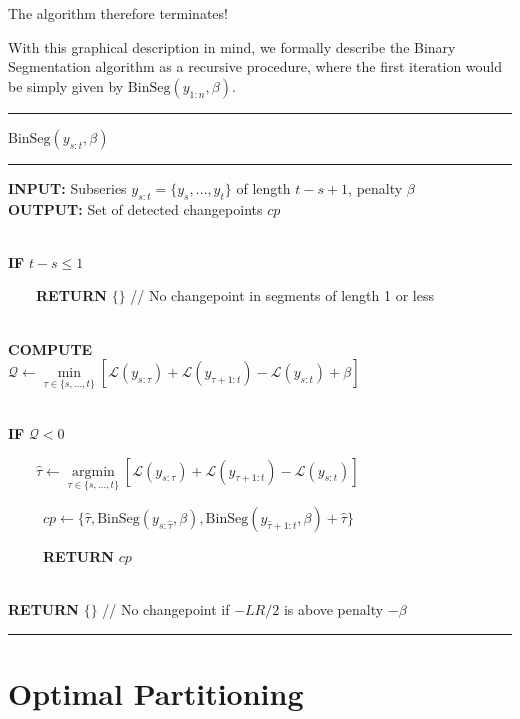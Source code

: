 \documentclass[
  letterpaper,
  DIV=11,
  numbers=noendperiod]{scrreprt}
\begin{document}
The algorithm therefore terminates!

With this graphical description in mind, we formally describe the Binary
Segmentation algorithm as a recursive procedure, where the first
iteration would be simply given by \(\text{BinSeg}(y_{1:n}, \beta)\).

\begin{center}\rule{0.5\linewidth}{0.5pt}\end{center}

\(\text{BinSeg}(y_{s:t}, \beta)\)\\

\begin{center}\rule{0.5\linewidth}{0.5pt}\end{center}

\textbf{INPUT:} Subseries \(y_{s:t} = \{y_s, \dots, y_t\}\) of length
\(t - s + 1\), penalty \(\beta\)\\
\textbf{OUTPUT:} Set of detected changepoints \(cp\)\\
\strut \\
\textbf{IF} \(t - s \leq 1\)\\
\strut ~~~~\textbf{RETURN} \(\{\}\) // No changepoint in segments of
length 1 or less\\
\strut \\
\textbf{COMPUTE}\\
\(\mathcal{Q} \leftarrow \underset{\tau \in \{s, \dots, t\}}{\min} \left[ \mathcal{L}(y_{s:\tau}) + \mathcal{L}(y_{\tau+1:t}) - \mathcal{L}(y_{s:t}) + \beta \right]\)\\
\strut \\
\textbf{IF} \(\mathcal{Q} < 0\)\\
\strut ~~~~\(\hat{\tau} \leftarrow \underset{\tau \in \{s, \dots, t\}}{\text{arg}\min} \left[ \mathcal{L}(y_{s:\tau}) + \mathcal{L}(y_{\tau+1:t}) - \mathcal{L}(y_{s:t}) \right]\)\\
\strut ~~~~~\(cp \leftarrow \{ \hat{\tau}, \text{BinSeg}(y_{s:\hat{\tau}}, \beta), \text{BinSeg}(y_{\hat{\tau}+1:t}, \beta) + \hat\tau \}\)\\
\strut ~~~~~\textbf{RETURN} \(cp\)\\
\strut \\
\textbf{RETURN} \(\{\}\) // No changepoint if \(-LR/2\) is above penalty
\(- \beta\)

\begin{center}\rule{0.5\linewidth}{0.5pt}\end{center}

\section{Optimal Partitioning}\label{optimal-partitioning}
\end{document}
